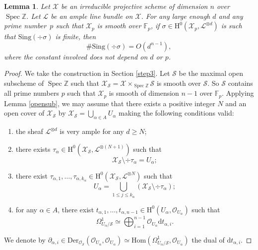\documentclass[JEP,XML,SOM,Unicode,published]{cedram}
\theoremstyle{plain}
\newtheorem{lem}[thm]{Lemma}
\theoremstyle{definition}
\newcommand{\ho}{\mathrm{H}}
\newcommand{\X}{\mathcal{X}}
\newcommand{\li}{\mathcal{L}}
\newcommand{\Z}{\mathbb{Z}}
\newcommand{\F}{\mathbb{F}}
\DeclareMathOperator{\Spec}{Spec}
\begin{document}

\begin{lem}\label{singnum}
Let $\X$ be an irreducible projective scheme of dimension $n$ over $\Spec \Z$. Let $\li$ be an ample line bundle on $\X$. For any large enough $d$ and any prime number~$p$ such that $\X_p$ is smooth over $\F_p$, if $\sigma\in \ho^0(\X_p, \li^{\otimes d})$ is such that $\mathrm{Sing}(\div \sigma)$ is finite, then
\[
\#\mathrm{Sing}(\div \sigma)=O(d^{n-1}),
\]
where the constant involved does not depend on $d$ or $p$.
\end{lem}

\begin{proof}
We take the construction in Section \ref{step3}. Let $\mathcal{S}$ be the maximal open subscheme of $\Spec \Z$ such that $\X_{\mathcal{S}}=\X\times_{\Spec \Z}\mathcal{S}$ is smooth over $\mathcal{S}$. So $\mathcal{S}$ contains all prime numbers $p$ such that $\X_p$ is smooth of dimension $n-1$ over $\F_p$. Applying Lemma \ref{opensub}, we may assume that there exists a positive integer $N$ and an open cover of $\X_{\mathcal{S}}$ by $\X_{\mathcal{S}}=\bigcup_{ \alpha\in A}U_{\alpha}$ making the following conditions valid:
\begin{enumerate}
\item the sheaf $\li^{\otimes d}$ is very ample for any $d\geq N$;
\item there exists $\tau_{\alpha}\in \ho^0(\X_{\mathcal{S}}, \li^{\otimes (N+1)})$ such that
\[
\X_{\mathcal{S}}\setminus\div \tau_{\alpha}=U_{\alpha};
\]
\item there exist $\tau_{\alpha,1},\dots, \tau_{\alpha,k_{\alpha}}\in \ho^0(\X_{\mathcal{S}}, \li^{\otimes N})$ such that
\[
U_{\alpha}=\bigcup_{1\leq j\leq k_{\alpha}}(\X_{\mathcal{S}}\setminus \div \tau_{\alpha});
\]
\item for any $\alpha\in A$, there exist $t_{\alpha, 1},\dots,t_{\alpha, n-1}\in \ho^0(U_{\alpha}, \mathcal{O}_{U_{\alpha}})$ such that
\[
\Omega^1_{U_{\alpha}/\mathcal{S}}\simeq \bigoplus_{i=1}^{n-1}\mathcal{O}_{U_{\alpha}}\mathrm{d}t_{\alpha,i}.
\]
\end{enumerate}
We denote by $\partial_{\alpha,i}\in \mathrm{Der}_{\mathcal{O}_{\mathcal{S}}}(\mathcal{O}_{U_{\alpha}},\mathcal{O}_{U_{\alpha}})\simeq \mathrm{Hom}(\Omega^1_{U_{\alpha}/\mathcal{S}}, \mathcal{O}_{U_{\alpha}})$ the dual of $\mathrm{d}t_{\alpha, i}$.


\end{proof}
\end{document}
